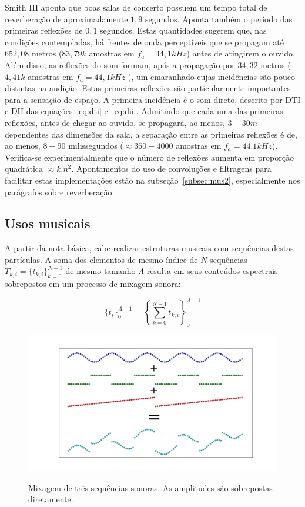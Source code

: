 Smith III aponta que boas salas de concerto possuem um tempo total de reverberação de aproximadamente $1,9$ segundos. Aponta também o período das primeiras reflexões de $0,1$ segundos. Estas quantidades sugerem que, nas condições contempladas, há frentes de onda perceptíveis que se propagam até $652,08$ metros ($83,79k$ amostras em $f_a=44,1kHz$) antes de atingirem o ouvido. Além disso, as reflexões do som formam, após a propagação por $34,32$ metros ($4,41k$ amostras em $f_a=44,1kHz$ ), um emaranhado cujas incidências são pouco distintas na audição. Estas primeiras reflexões são particularmente importantes para a sensação de espaço. A primeira incidência é o som direto, descrito por DTI e DII das equações~\ref{eq:dti} e~\ref{eq:dii}. Admitindo que cada uma das primeiras reflexões, antes de chegar ao ouvido, se propagará, ao menos, $3-30m$ dependentes das dimensões da sala, a separação entre as primeiras reflexões é de, ao menos, $8-90$ milissegundos ($\approx 350-4000$ amostras em $f_a=44.1kHz$). Verifica-se experimentalmente que o número de reflexões aumenta em proporção quadrática  $ \approx k.n^2$. Apontamentos do uso de convoluções e filtragens para facilitar estas implementações estão na subseção~\ref{subsec:mus2}, especialmente nos parágrafos sobre reverberação.

\subsection{Usos musicais}\label{subsec:basMus}


A partir da nota básica, cabe realizar estruturas musicais com
sequências destas partículas. A soma dos elementos de mesmo índice de $N$ sequências $T_{k,i}=\{t_{k,i}\}_{k=0}^{N-1}$ de mesmo tamanho $\Lambda$ resulta em seus conteúdos espectrais sobrepostos em um processo de mixagem sonora:

\begin{equation}\label{eq:mixagem}
\{t_i\}_0^{\Lambda-1}=\left \{ \sum_{k=0}^{N-1}t_{k,i} \right \}_0^{\Lambda-1}
\end{equation}

\begin{figure}[h!]
    {\centering
        \includegraphics[width=\textwidth]{figuras/mixagem}}
    \caption{Mixagem de três sequências sonoras. As amplitudes são sobrepostas diretamente.}

        \label{fig:mixagem}
\end{figure}


